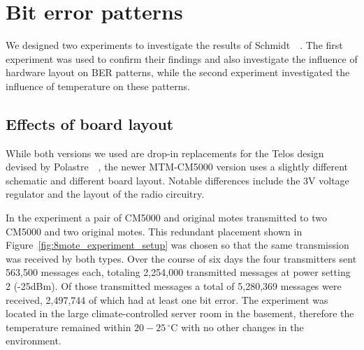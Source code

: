 \section{Bit error patterns}
\label{sec:bit_error_patterns}

We designed two experiments to investigate the results of Schmidt~\etal~\cite{Schmidt2013}.
The first experiment was used to confirm their findings and also investigate the influence of hardware layout on \ac{BER} patterns, while the second experiment investigated the influence of temperature on these patterns.

\subsection{Effects of board layout}
\label{subsec:effects_of_board_layout}

While both versions we used are drop-in replacements for the Telos design devised by Polastre~\etal~\cite{Polastre2005}, the newer MTM-CM5000 version uses a slightly different schematic and different board layout.
Notable differences include the 3V voltage regulator and the layout of the radio circuitry.

In the experiment a pair of CM5000 and original motes transmitted to two CM5000 and two original motes.
This redundant placement shown in Figure~\ref{fig:8mote_experiment_setup} was chosen so that the same transmission was received by both types.
Over the course of six days the four transmitters sent 563,500 messages each, totaling 2,254,000 transmitted messages at power setting 2 (-25dBm). Of those transmitted messages a total of 5,280,369 messages were received, 2,497,744 of which had at least one bit error.
The experiment was located in the large climate-controlled server room in the basement, therefore the temperature remained within $20-25\,^{\circ}\mathrm{C}$ with no other changes in the environment.

